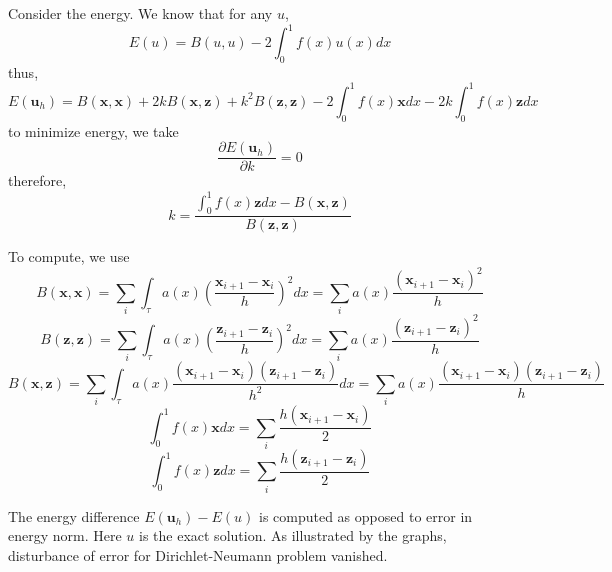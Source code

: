 \documentclass[12pt]{article}
\begin{document}
Consider the energy. We know that for any $u$,
$$E(u)=B(u,u)-2\int_{0}^{1}f(x)u(x)dx$$
thus,
$$E(\textbf{u}_{h})=B(\textbf{x},\textbf{x})+2kB(\textbf{x},\textbf{z})+k^2B(\textbf{z},\textbf{z})-2\int_{0}^{1}f(x)\textbf{x}dx-2k\int_{0}^{1}f(x)\textbf{z}dx$$
to minimize energy, we take
$$\frac{\partial E(\textbf{u}_{h})}{\partial k}=0$$
therefore,
$$k=\frac{\int_{0}^{1}f(x)\textbf{z}dx-B(\textbf{x},\textbf{z})}{B(\textbf{z},\textbf{z})}$$

To compute, we use
$$B(\textbf{x},\textbf{x})=\sum_{i}\int_{\tau}a(x)(\frac{\textbf{x}_{i+1}-\textbf{x}_{i}}{h})^2dx=\sum_{i}a(x)\frac{(\textbf{x}_{i+1}-\textbf{x}_{i})^2}{h}$$
$$B(\textbf{z},\textbf{z})=\sum_{i}\int_{\tau}a(x)(\frac{\textbf{z}_{i+1}-\textbf{z}_{i}}{h})^2dx=\sum_{i}a(x)\frac{(\textbf{z}_{i+1}-\textbf{z}_{i})^2}{h}$$
$$B(\textbf{x},\textbf{z})=\sum_{i}\int_{\tau}a(x)\frac{(\textbf{x}_{i+1}-\textbf{x}_{i})(\textbf{z}_{i+1}-\textbf{z}_{i})}{h^2}dx=\sum_{i}a(x)\frac{(\textbf{x}_{i+1}-\textbf{x}_{i})(\textbf{z}_{i+1}-\textbf{z}_{i})}{h}$$
$$\int_{0}^{1}f(x)\textbf{x}dx=\sum_{i}\frac{h(\textbf{x}_{i+1}-\textbf{x}_{i})}{2}$$
$$\int_{0}^{1}f(x)\textbf{z}dx=\sum_{i}\frac{h(\textbf{z}_{i+1}-\textbf{z}_{i})}{2}$$

The energy difference $E(\textbf{u}_{h})-E(u)$ is computed as opposed to error in energy norm. Here $u$ is the exact solution. As illustrated by the graphs, disturbance of error for Dirichlet-Neumann problem vanished.
\end{document}
